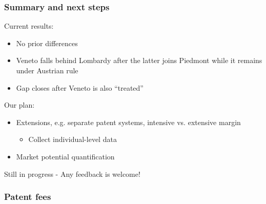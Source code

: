 \documentclass[10pt]{beamer}
\begin{document}
\begin{frame}
    \frametitle{Summary and next steps}

    Current results:
    \begin{itemize}
        \item No prior differences
        \item Veneto falls behind Lombardy after the latter joins Piedmont while it remains under Austrian rule
        \item Gap closes after Veneto is also ``treated''
    \end{itemize}

    
    \bigskip
    
    Our plan:
    \begin{itemize}
        \item Extensions, e.g. separate patent systems, intensive vs. extensive margin
        \begin{itemize}
            \item Collect individual-level data
        \end{itemize}
        \item Market potential quantification
    \end{itemize}
  
    \bigskip
    
    Still in progress - Any feedback is welcome!

\end{frame}

\appendix


\begin{frame}[label = patent_fees]
    \frametitle{Patent fees}


\hyperlink{other_dimensions}{}

\end{frame}
\end{document}
